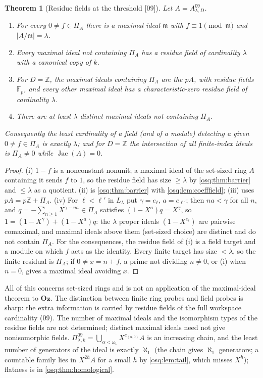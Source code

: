 \documentclass[11pt,letterpaper]{article}
\numberwithin{equation}{section}
\newtheorem{theorem}{Theorem}[section]
\theoremstyle{definition}
\theoremstyle{remark}
\theoremstyle{plain}
\newcommand{\Oz}{\mathbf{Oz}}
\newcommand{\Z}{\mathbb Z}
\newcommand{\F}{\mathbb F}
\newcommand{\Jac}{\operatorname{Jac}}
\newcommand{\src}[1]{\textup{\textsf{[#1]}}}
\begin{document}
\begin{theorem}[Residue fields at the threshold \src{09}]\label{osq:thm:residue}
Let $A=A^{09}_{\lambda,D}$.
\begin{enumerate}
\item For every $0\ne f\in\Pi_A$ there is a maximal ideal $\mathfrak m$ with $f\equiv1\pmod{\mathfrak m}$ and
$|A/\mathfrak m|=\lambda$.
\item Every maximal ideal not containing $\Pi_A$ has a residue field of cardinality $\lambda$ with a canonical
copy of $k$.
\item For $D=\Z$, the maximal ideals containing $\Pi_A$ are the $pA$, with residue fields $\F_p$, and every other
maximal ideal has a characteristic-zero residue field of cardinality $\lambda$.
\item There are at least $\lambda$ distinct maximal ideals not containing $\Pi_A$.
\end{enumerate}
Consequently the least cardinality of a field (and of a module) detecting a given $0\ne f\in\Pi_A$ is exactly
$\lambda$; and for $D=\Z$ the intersection of all finite-index ideals is $\Pi_A\ne0$ while $\Jac(A)=0$.
\end{theorem}
\begin{proof}
(i) $1-f$ is a nonconstant nonunit; a maximal ideal of the set-sized ring $A$ containing it sends $f$ to $1$, so
the residue field has size $\ge\lambda$ by \cref{osq:thm:barrier} and $\le\lambda$ as a quotient. (ii) is
\cref{osq:thm:barrier} with \cref{osq:lem:coefffield}; (iii) uses $pA=p\Z+\Pi_A$. (iv) For $\ell<\ell'$ in
$L_\lambda$ put $\gamma=e_\ell$, $a=e_{\ell'}$; then $na<\gamma$ for all $n$, and
$q=-\sum_{n\ge1}X^{\gamma-na}\in\Pi_A$ satisfies $(1-X^a)q=X^\gamma$, so
$1=(1-X^\gamma)+(1-X^a)q$: the $\lambda$ proper ideals $(1-X^{e_\ell})$ are pairwise comaximal, and maximal
ideals above them (set-sized choice) are distinct and do not contain $\Pi_A$. For the consequences, the
residue field of (i) is a field target and a module on which $f$ acts as the identity. Every finite target has
size $<\lambda$, so the finite residual is $\Pi_A$; if $0\ne x=n+f$, a prime not dividing $n\ne0$, or (i) when
$n=0$, gives a maximal ideal avoiding $x$.
\end{proof}

All of this concerns set-sized rings and is not an application of the maximal-ideal theorem to $\Oz$. The
distinction between finite ring probes and field probes is sharp: the extra information is carried by residue
fields of the full workspace cardinality (09). The number of maximal ideals and the isomorphism types of the
residue fields are not determined; distinct maximal ideals need not give nonisomorphic fields.
$\Pi^{09}_{\lambda,k}=\bigcup_{\alpha<\omega_1}X^{e_{(\alpha,0)}}A$ is an increasing chain, and the least number of
generators of the ideal is exactly $\aleph_1$ (the chain gives $\aleph_1$ generators; a countable family lies in
$X^{2h}A$ for a small $h$ by \cref{osq:lem:tail}, which misses $X^h$); flatness is in
\cref{osq:thm:homological}.
\end{document}
